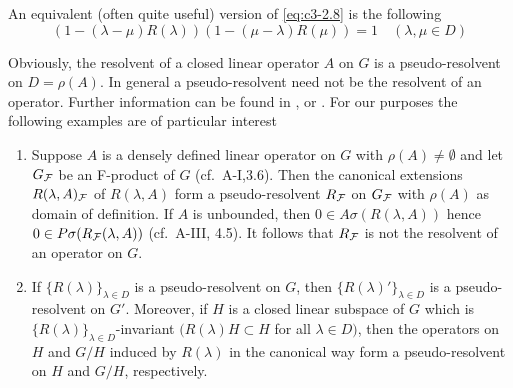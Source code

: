 An equivalent (often quite useful) version of \eqref{eq:c3-2.8} is the following
\begin{equation}\label{eq:c3-2.9}
	(1 - (\lambda - \mu)R(\lambda))(1 - (\mu - \lambda)R(\mu)) = 1 \quad (\lambda,\mu \in D)
\end{equation}

Obviously, the resolvent of a closed linear operator $A$ on $G$ is a pseudo-resolvent on $D = \rho(A)$.
In general a pseudo-resolvent need not be the resolvent of an operator.
Further information can be found in \citet{hillephillips:1957}, \citet{pazy:1983} or \citet{yosida:1965}.
For our purposes the following examples are of particular interest

\begin{example}\label{ex:c3-2.5}
	\begin{enumerate}
		\item 
		Suppose $A$ is a densely defined linear operator on $G$ with $\rho(A) \neq \emptyset$ and let $G_{\mathcal{F}}$ be an F-product of $G$ (cf.\ A-I,3.6).
		Then the canonical extensions $R(\lambda,A)_{\mathcal{F}}$ of $R(\lambda,A)$ form a pseudo-resolvent $R_{\mathcal{F}}$ on $G_{\mathcal{F}}$ with $\rho(A)$ as domain of definition.
		If $A$ is unbounded, then $0 \in A\sigma(R(\lambda,A))$ hence $0 \in P\sigma(R_{\mathcal{F}}(\lambda,A))$ (cf.\ A-III, 4.5).
		It follows that $R_{\mathcal{F}}$ is not the resolvent of an operator on $G$.
		
		\item 
		If $\{R(\lambda)\}_{\lambda\in D}$ is a pseudo-resolvent on $G$, then $\{R(\lambda)'\}_{\lambda\in D}$ is a pseudo-resolvent on $G'$.
		Moreover, if $H$ is a closed linear subspace of $G$ which is $\{R(\lambda)\}_{\lambda\in D}$-invariant $(R(\lambda)H \subset H$ for all $\lambda \in D)$, then the operators on $H$ and $G/H$ induced by $R(\lambda)$ in the canonical way form a pseudo-resolvent on $H$ and $G/H$, respectively.
	\end{enumerate}
\end{example}

